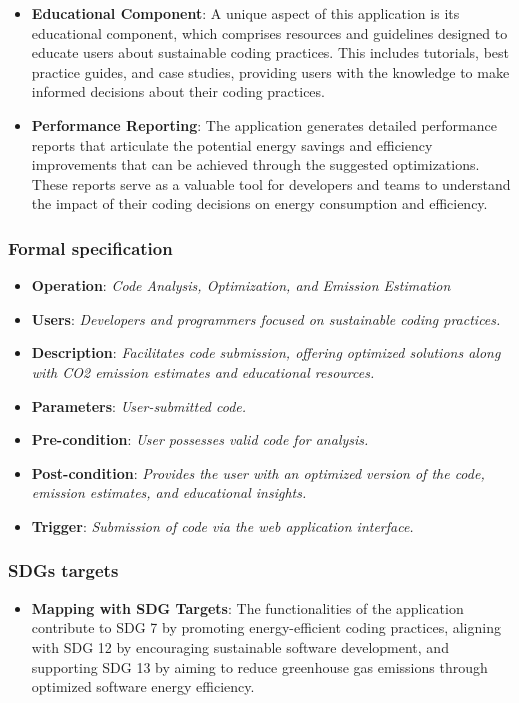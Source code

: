 \documentclass[conference,compsoc]{IEEEtran}
\begin{document}
\begin{itemize}
    \item \textbf{Educational Component}: A unique aspect of this application is its educational component, which comprises resources and guidelines designed to educate users about sustainable coding practices. This includes tutorials, best practice guides, and case studies, providing users with the knowledge to make informed decisions about their coding practices.
    
    \item \textbf{Performance Reporting}: The application generates detailed performance reports that articulate the potential energy savings and efficiency improvements that can be achieved through the suggested optimizations. These reports serve as a valuable tool for developers and teams to understand the impact of their coding decisions on energy consumption and efficiency.
    \end{itemize}

\subsubsection{Formal specification}
\begin{itemize}
    \item \textbf{Operation}: \textit{Code Analysis, Optimization, and Emission Estimation}
    \item \textbf{Users}: \textit{Developers and programmers focused on sustainable coding practices.}
    \item \textbf{Description}: \textit{Facilitates  code submission, offering optimized solutions along with CO2 emission estimates and educational resources.}
    \item \textbf{Parameters}: \textit{User-submitted  code.}
    \item \textbf{Pre-condition}: \textit{User possesses valid  code for analysis.}
    \item \textbf{Post-condition}: \textit{Provides the user with an optimized version of the code, emission estimates, and educational insights.}
    \item \textbf{Trigger}: \textit{Submission of code via the web application interface.}
\end{itemize}

\subsubsection{SDGs targets}
\begin{itemize}
    \item \textbf{Mapping with SDG Targets}: The functionalities of the application contribute to SDG 7 by promoting energy-efficient coding practices, aligning with SDG 12 by encouraging sustainable software development, and supporting SDG 13 by aiming to reduce greenhouse gas emissions through optimized software energy efficiency.
\end{itemize}
\end{document}
